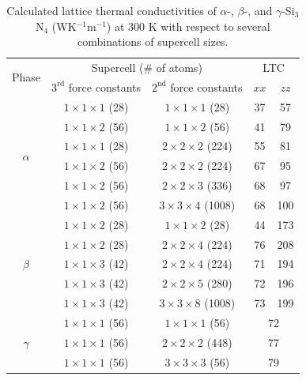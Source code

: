 \documentclass[twocolumn,amsmath,amssymb,a4paper,prb,superscriptaddress,floatfix]{revtex4-1}
\begin{document}
\begin{table}[ht]
	\caption{\label{table:LTC} Calculated lattice thermal conductivities 
 of $\alpha$-, $\beta$-, and $\gamma$-Si$_3$N$_4$
 (WK$^{-1}$m$^{-1}$) at 300 K with respect to several combinations of
 supercell sizes.}
 \begin{ruledtabular}
  \begin{tabular}{ccccc}
   \multirow{2}{*}{Phase}
   & \multicolumn{2}{c}{Supercell (\# of atoms)} &
   \multicolumn{2}{c}{LTC} \\
   \cline{2-5}
   & $3^\text{rd}$ force constants & $2^\text{nd}$ force constants & $xx$ & $zz$ \\
   \hline
   \multirow{6}{*}{$\alpha$}
   & $1\times 1\times 1$ (28) & $1\times
   1\times 1$ (28) & 37 &   57 \\ 
   & $1\times 1\times 2$ (56) & $1\times
   1\times 2$ (56) & 41 &   79 \\ 
   & $1\times 1\times 1$ (28) & $2\times
   2\times 2$ (224) & 55 &   81 \\ 
   & $1\times 1\times 2$ (56) & $2\times
   2\times 2$ (224) & 67 &   95 \\ 
   & $1\times 1\times 2$ (56) & $2\times
   2\times 3$ (336) & 68 &  97 \\ 
   & $1\times 1\times 2$ (56) & $3\times
   3\times 4$ (1008) & 68 &  100 \\ 
   \hline
   \multirow{5}{*}{$\beta$}
   & $1\times 1\times 2$ (28) & $1\times
   1\times 2$ (28) & 44 & 173 \\ 
   & $1\times 1\times 2$ (28) & $2\times
   2\times 4$ (224) & 76 &  208 \\ 
   & $1\times 1\times 3$ (42) & $2\times
   2\times 4$ (224) & 71 & 194 \\ 
   & $1\times 1\times 3$ (42) & $2\times
   2\times 5$ (280) & 72 & 196 \\ 
   & $1\times 1\times 3$ (42) & $3\times
   3\times 8$ (1008) & 73 & 199 \\ 
   \hline
   \multirow{3}{*}{$\gamma$}
   & $1\times 1\times 1$ (56) & $1\times
   1\times 1$ (56) & \multicolumn{2}{c}{72} \\ 
   & $1\times 1\times 1$ (56) & $2\times
   2\times 2$ (448) & \multicolumn{2}{c}{77} \\ 
   & $1\times 1\times 1$ (56) & $3\times
   3\times 3$ (56) & \multicolumn{2}{c}{79} \\ 
  \end{tabular}
 \end{ruledtabular}
\end{table}
\end{document}
